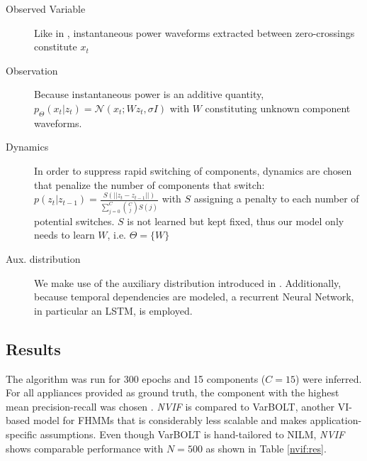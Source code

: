 \begin{description}%
\item[Observed Variable] Like in \cite{lange2018varbolt}, instantaneous power waveforms extracted between zero-crossings constitute $x_t$
\item[Observation] Because instantaneous power is an additive quantity, $p_\Theta(x_t|z_t) = \mathcal{N}(x_t; Wz_t, \sigma I)$ with $W$ constituting unknown component waveforms.
\item[Dynamics] In order to suppress rapid switching of components, dynamics are chosen that penalize the number of components that switch: $p(z_t | z_{t-1}) = \frac{S(||z_{t} - z_{t-1}||)}{\sum_{j=0}^C \binom{C}{j} S(j)}$ with $S$ assigning a penalty to each number of potential switches. $S$ is not learned but kept fixed, thus our model only needs to learn $W$, i.e. $\Theta = \{W\}$
\item[Aux. distribution] We make use of the auxiliary distribution introduced in \cite{lange2018factornet}. Additionally, because temporal dependencies are modeled, a recurrent Neural Network, in particular an LSTM, is employed.
\end{description}


\subsection{Results}
The algorithm was run for 300 epochs and 15 components ($C=15$) were inferred. For all appliances provided as ground truth, the component with the highest mean precision-recall was chosen \cite{kolter2012approximate}. \emph{NVIF} is compared to VarBOLT, another VI-based model for FHMMs that is considerably less scalable and makes application-specific assumptions. Even though VarBOLT is hand-tailored to NILM, \emph{NVIF} shows comparable performance with $N=500$ as shown in Table \ref{nvif:res}.

